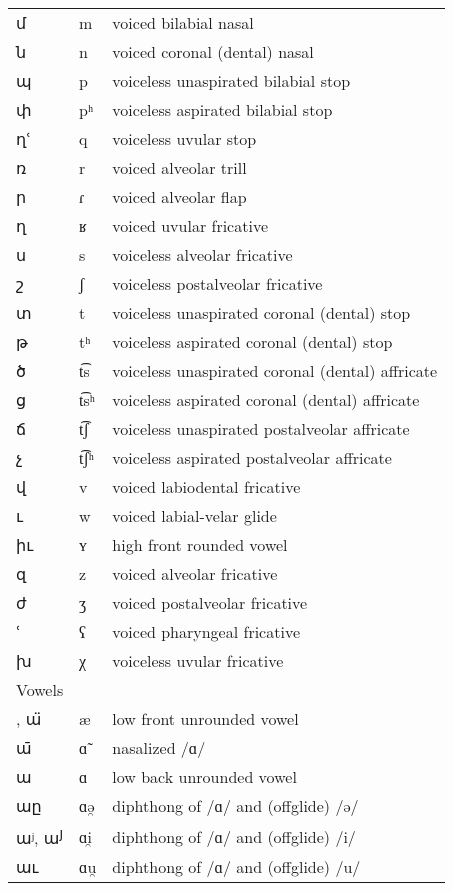 \begin{center}
\begin{longtable}{|lll|}
		մ	& 	m 	& 	voiced bilabial nasal	\\
		ն	& 	n 	& 	voiced coronal (dental) nasal	\\
		պ	& 	p	& 	voiceless unaspirated bilabial stop	\\
		փ	& 	pʰ	& 	voiceless aspirated bilabial stop	\\
		ղՙ	& 	q	& 	voiceless uvular stop	\\
		ռ	& 	r 	& 	voiced alveolar trill	\\
		ր	& 	ɾ	& 	voiced alveolar flap	\\
		ղ	& 	ʁ	& 	voiced uvular fricative	\\
		ս	& 	s	& 	voiceless alveolar fricative	\\
		շ	& 	ʃ	& 	voiceless postalveolar fricative	\\
		տ	& 	t	& 	voiceless unaspirated coronal (dental) stop	\\
		թ	& 	tʰ 	& 	voiceless aspirated coronal (dental) stop	\\
		ծ	& 	t͡s 	& 	voiceless unaspirated coronal (dental) affricate	\\
		ց	& 	t͡sʰ	& 	voiceless aspirated coronal (dental) affricate	\\
		ճ	& 	t͡ʃ	& 	voiceless unaspirated postalveolar affricate	\\
		չ	& 	t͡ʃʰ	& 	voiceless aspirated postalveolar affricate	\\
		վ	& 	v	& 	voiced labiodental fricative	\\
		ւ	& 	w	& 	voiced labial-velar glide	\\
		իւ	& 	ʏ	& 	high front rounded vowel	\\
		զ	& 	z 	& 	voiced alveolar fricative	\\
		ժ	& 	ʒ	& 	voiced postalveolar fricative	\\
		ՙ	& 	ʕ	& 	voiced pharyngeal fricative	\\
		խ	& 	χ	& 	voiceless uvular fricative	\\
		\hline
		\multicolumn{3}{|l|}{Vowels}			\\
		\armeniang{ՠ}, ա̈	& 	æ	& 	low front unrounded vowel	\\
		ա̄	& 	ɑ̃	& 	nasalized /ɑ/	\\
		ա	& 	ɑ 	& 	low back unrounded vowel	\\
		աը	& 	ɑə̯	& 	diphthong of /ɑ/ and  (offglide) /ə/	\\
		աʲ, ա\textsuperscript{յ}	& 	ɑi̯	& 	diphthong of /ɑ/ and  (offglide) /i/	\\
		աւ	& 	ɑu̯	& 	diphthong of /ɑ/ and  (offglide) /u/	\\

\end{longtable}
\end{center}
